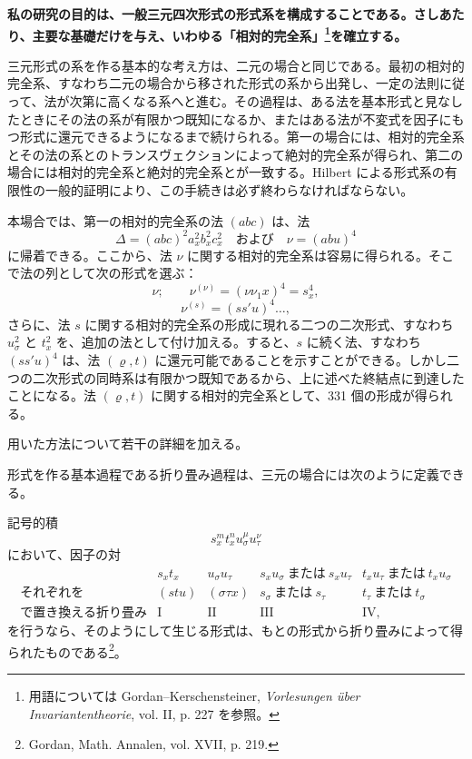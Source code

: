 \documentclass[11pt]{article}
\begin{document}
\textbf{私の研究の目的は、一般三元四次形式の形式系を構成することである。さしあたり、主要な基礎だけを与え、いわゆる「相対的完全系」\footnote{用語については Gordan--Kerschensteiner, \emph{Vorlesungen über Invariantentheorie}, vol. II, p. 227 を参照。}を確立する。}

三元形式の系を作る基本的な考え方は、二元の場合と同じである。最初の相対的完全系、すなわち二元の場合から移された形式の系から出発し、一定の法則に従って、法が次第に高くなる系へと進む。その過程は、ある法を基本形式と見なしたときにその法の系が有限かつ既知になるか、またはある法が不変式を因子にもつ形式に還元できるようになるまで続けられる。第一の場合には、相対的完全系とその法の系とのトランスヴェクションによって絶対的完全系が得られ、第二の場合には相対的完全系と絶対的完全系とが一致する。Hilbert による形式系の有限性の一般的証明により、この手続きは必ず終わらなければならない。

本場合では、第一の相対的完全系の法 \((abc)\) は、法
\[
\Delta=(abc)^2a_x^2b_x^2c_x^2\quad\text{および}\quad \nu=(abu)^4
\]
に帰着できる。ここから、法 \(\nu\) に関する相対的完全系は容易に得られる。そこで法の列として次の形式を選ぶ：
\[
\nu;\qquad \nu^{(\nu)}=(\nu\nu_1x)^4=s_x^4,
\]
\[
\nu^{(s)}=(ss'u)^4\ldots,
\]
さらに、法 \(s\) に関する相対的完全系の形成に現れる二つの二次形式、すなわち \(u_\sigma^2\) と \(t_x^2\) を、追加の法として付け加える。すると、\(s\) に続く法、すなわち \((ss'u)^4\) は、法 \((\varrho,t)\) に還元可能であることを示すことができる。しかし二つの二次形式の同時系は有限かつ既知であるから、上に述べた終結点に到達したことになる。法 \((\varrho,t)\) に関する相対的完全系として、331 個の形成が得られる。

用いた方法について若干の詳細を加える。

形式を作る基本過程である折り畳み過程は、三元の場合には次のように定義できる。

記号的積
\[
s_x^m t_x^n u_\sigma^\mu u_\tau^\nu
\]
において、因子の対
\[
\begin{array}{c|c|c|c|c}
 & s_xt_x & u_\sigma u_\tau & s_xu_\sigma\ \text{または}\ s_xu_\tau & t_xu_\tau\ \text{または}\ t_xu_\sigma\\
\text{それぞれを} & (stu) & (\sigma\tau x) & s_\sigma\ \text{または}\ s_\tau & t_\tau\ \text{または}\ t_\sigma\\
\text{で置き換える折り畳み} & \mathrm{I} & \mathrm{II} & \mathrm{III} & \mathrm{IV},
\end{array}
\]
を行うなら、そのようにして生じる形式は、もとの形式から折り畳みによって得られたものである\footnote{Gordan, Math. Annalen, vol. XVII, p. 219.}。
\end{document}
